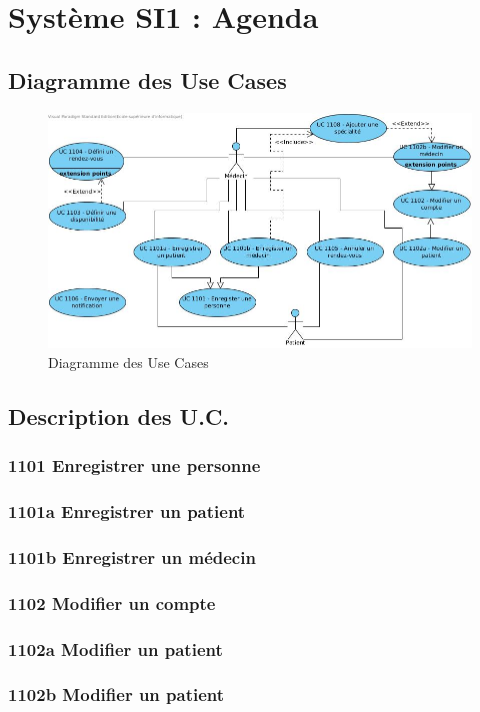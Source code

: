\documentclass[a4paper, 11pt]{report}
\begin{document}
\section{Système SI1 : Agenda}
\subsection{Diagramme des Use Cases}
\begin{figure}[hb]
	\centering
	\includegraphics[scale=0.5]{SS1_UC.jpg}
	\caption{Diagramme des Use Cases}
	\label{fig:ss1_uc}
\end{figure}
\subsection{Description des U.C.}
\subsubsection{1101 Enregistrer une personne}
\subsubsection{1101a Enregistrer un patient}
\subsubsection{1101b Enregistrer un médecin}
\subsubsection{1102 Modifier un compte}
\subsubsection{1102a Modifier un patient}
\subsubsection{1102b Modifier un patient}
\end{document}
